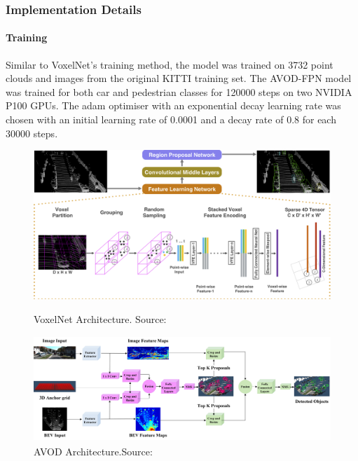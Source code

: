 \subsubsection*{Implementation Details}

\paragraph{Training}
Similar to VoxelNet's training method, the model was trained on 3732 point clouds  and images from the original KITTI training set. The AVOD-FPN model was trained for both car and pedestrian classes for 120000 steps on two NVIDIA P100 GPUs. The adam optimiser with an exponential decay learning rate was chosen with an initial learning rate of 0.0001 and a decay rate of 0.8 for each 30000 steps. 

\begin{figure}[H]
	\centering
	\begin{minipage}[b]{0.45\textwidth}
		\includegraphics[width=\textwidth]{images/vox_arch.png}
		\caption{VoxelNet Architecture. Source:\cite{zhou2017voxelnet}}
		\label{fig:voxarch}
	\end{minipage}
	\hfill
	\begin{minipage}[b]{0.45\textwidth}
		\includegraphics[width=\textwidth,height=4cm]{images/avodarch.png}
		\caption{AVOD Architecture.Source:\cite{ku2017joint}}
		\label{fig:avodarch}
	\end{minipage}
\end{figure}


